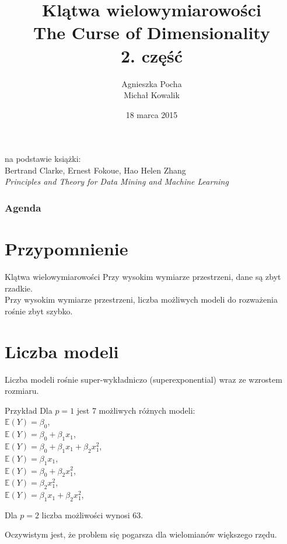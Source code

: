 \documentclass[a4paper]{beamer}
\author{Agnieszka Pocha \\ Michał Kowalik}
\title{Klątwa wielowymiarowości \\ The Curse of Dimensionality \\ 2. część}
\date{18 marca 2015}
\begin{document}
\begin{frame}
\titlepage
{\footnotesize
na podstawie książki: \\
Bertrand Clarke, Ernest Fokoue, Hao Helen Zhang \\
}
\textit{Principles and Theory for Data Mining and Machine Learning}
\end{frame}


\begin{frame}
\frametitle{Agenda}
\tableofcontents
\end{frame}

\section{Przypomnienie}
\begin{frame}
\begin{block}{Klątwa wielowymiarowości}
Przy wysokim wymiarze przestrzeni, dane są zbyt rzadkie. \\
Przy wysokim wymiarze przestrzeni, liczba możliwych modeli do rozważenia rośnie zbyt szybko.
\end{block}
\end{frame}

\section{Liczba modeli}
\begin{frame}
\begin{block}{}
Liczba modeli rośnie super-wykładniczo (superexponential) wraz ze wzrostem rozmiaru.
\end{block}
\begin{block}{Przykład}
Dla $p=1$ jest 7 możliwych różnych modeli: \\
$\mathbb{E}(Y) = \beta_0$, \\
$\mathbb{E}(Y) = \beta_0 + \beta_1 x_1$, \\
$\mathbb{E}(Y) = \beta_0 + \beta_1 x_1 + \beta_2 x_1^2$, \\[0.3cm]


$\mathbb{E}(Y) = \beta_1 x_1$, \\
$\mathbb{E}(Y) = \beta_0 + \beta_2 x_1^2$, \\[0.3cm]


$\mathbb{E}(Y) = \beta_2 x_1^2$, \\
$\mathbb{E}(Y) = \beta_1 x_1 + \beta_2 x_1^2$, \\

\end{block}
\begin{block}{}
Dla $p=2$ liczba możliwości wynosi 63.
\end{block}
\begin{block}{}
Oczywistym jest, że problem się pogarsza dla wielomianów większego rzędu.
\end{block}
\end{frame}
\end{document}
